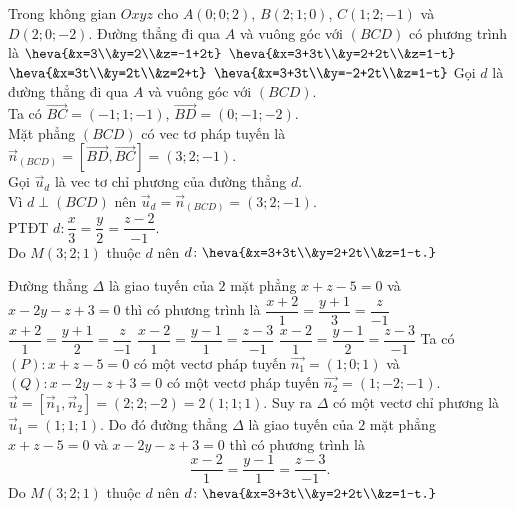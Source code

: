 \begin{ex}%
	Trong không gian $Oxyz$ cho $A(0;0;2)$, $B(2;1;0)$, $C(1;2;-1)$ và $D(2;0;-2)$. Đường thẳng đi qua $A$ và vuông góc với $(BCD)$ có phương trình là
	\choice
	{$\heva{&x=3\\&y=2\\&z=-1+2t}$}
	{\True $\heva{&x=3+3t\\&y=2+2t\\&z=1-t}$}
	{$\heva{&x=3t\\&y=2t\\&z=2+t}$}
	{$\heva{&x=3+3t\\&y=-2+2t\\&z=1-t}$}
	\loigiai
	{
		Gọi $d$ là đường thẳng đi qua $A$ và vuông góc với $(BCD)$.\\
		Ta có $\overrightarrow{BC}=(-1;1;-1)$, $\overrightarrow{BD}=(0;-1;-2)$.\\
		Mặt phẳng $(BCD)$ có vec tơ pháp tuyến là $\vec{n}_{(BCD)}=\left[\overrightarrow{BD},\overrightarrow{BC}\right]=(3;2;-1)$.\\
		Gọi $\vec{u}_{d}$ là vec tơ chỉ phương của đường thẳng $d$.\\
		Vì $d\perp(BCD)$ nên $\overrightarrow{u}_{d}=\vec{n}_{(BCD)}=(3;2;-1)$.\\
		PTĐT $d\colon\dfrac{x}{3}=\dfrac{y}{2}=\dfrac{z-2}{-1}$.\\
		Do $M(3;2;1)$ thuộc $d$ nên $d\colon\heva{&x=3+3t\\&y=2+2t\\&z=1-t.}$
	}
\end{ex}
\begin{ex}%
	Đường thẳng $\Delta$ là giao tuyến của $2$ mặt phẳng $x+z-5=0$ và $x-2y-z+3=0$ thì có phương trình là
	\choice
	{$\dfrac{x+2}{1}=\dfrac{y+1}{3}=\dfrac{z}{-1}$}
	{$\dfrac{x+2}{1}=\dfrac{y+1}{2}=\dfrac{z}{-1}$}
	{\True $\dfrac{x-2}{1}=\dfrac{y-1}{1}=\dfrac{z-3}{-1}$}
	{$\dfrac{x-2}{1}=\dfrac{y-1}{2}=\dfrac{z-3}{-1}$}
	\loigiai
	{
		Ta có $(P)\colon x+z-5=0$ có một vectơ pháp tuyến $\overrightarrow{n_{1}}=(1;0;1)$ và $(Q)\colon x-2y-z+3=0$ có một vectơ pháp tuyến $\overrightarrow{n_{2}}=(1;-2;-1)$.\\
		$\vec{u}=\left[\overrightarrow{n}_{1},\overrightarrow{n}_{2}\right]=(2;2;-2)=2(1;1;1)$.
		Suy ra $\Delta$ có một vectơ chỉ phương là $\vec{u}_{1}=(1;1;1)$.
		Do đó đường thẳng $\Delta$ là giao tuyến của $2$ mặt phẳng $x+z-5=0$ và $x-2y-z+3=0$ thì có phương trình là 
		$$\dfrac{x-2}{1}=\dfrac{y-1}{1}=\dfrac{z-3}{-1}.$$
		Do $M(3;2;1)$ thuộc $d$ nên $d\colon\heva{&x=3+3t\\&y=2+2t\\&z=1-t.}$
	}
\end{ex}
